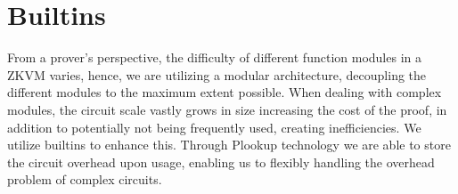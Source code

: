\section{Builtins} \label{sec:builtins}

From a prover's perspective, the difficulty of different function modules in a ZKVM varies, hence, we are utilizing a modular architecture, decoupling the different modules to the maximum extent possible. When dealing with complex modules, the circuit scale vastly grows in size increasing the cost of the proof, in addition to potentially not being frequently used, creating inefficiencies. We utilize builtins to enhance this. Through Plookup technology we are able to store the circuit overhead upon usage, enabling us to flexibly handling the overhead problem of complex circuits.






